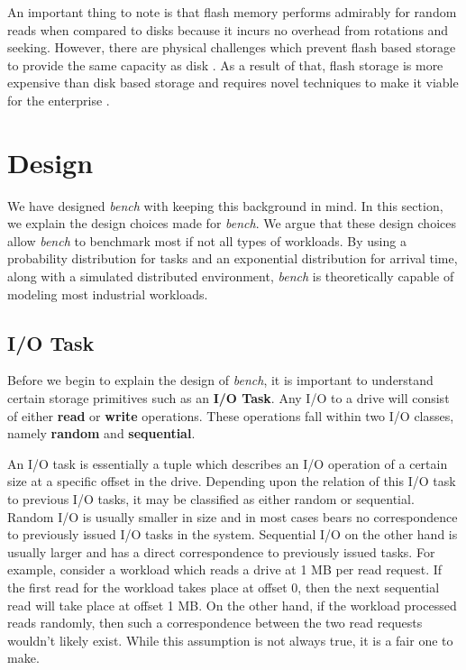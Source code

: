 \documentclass[10pt, author, twocolumn]{article}
\begin{document}
An important thing to note is that flash memory performs admirably for random reads when compared to disks because it incurs no overhead from rotations and seeking. However, there are physical challenges which prevent flash based storage to provide the same capacity as disk \cite{micheloni2010nand}. As a result of that, flash storage is more expensive than disk based storage and requires novel techniques to make it viable for the enterprise \cite{colgrove2015purity}. 

\section{Design}
We have designed \textit{bench} with keeping this background in mind. In this section, we explain the design choices made for \textit{bench}. We argue that these design choices allow \textit{bench} to benchmark most if not all types of workloads. By using a probability distribution for tasks and an exponential distribution for arrival time, along with a simulated distributed environment, \textit{bench} is theoretically capable of modeling most industrial workloads. 

\subsection{I/O Task}
Before we begin to explain the design of \textit{bench}, it is important to understand certain storage primitives such as an \textbf{I/O Task}. Any I/O to a drive will consist of either \textbf{read} or \textbf{write} operations. These operations fall within two I/O classes, namely \textbf{random} and \textbf{sequential}. 

An I/O task is essentially a tuple which describes an I/O operation of a certain size at a specific offset in the drive. Depending upon the relation of this I/O task to previous I/O tasks, it may be classified as either random or sequential. Random I/O is usually smaller in size and in most cases bears no correspondence to previously issued I/O tasks in the system. Sequential I/O on the other hand is usually larger and has a direct correspondence to previously issued tasks. For example, consider a workload which reads a drive at 1 MB per read request. If the first read for the workload takes place at offset 0, then the next sequential read will take place at offset 1 MB. On the other hand, if the workload processed reads randomly, then such a correspondence between the two read requests wouldn't likely exist. While this assumption is not always true, it is a fair one to make.
\end{document}
